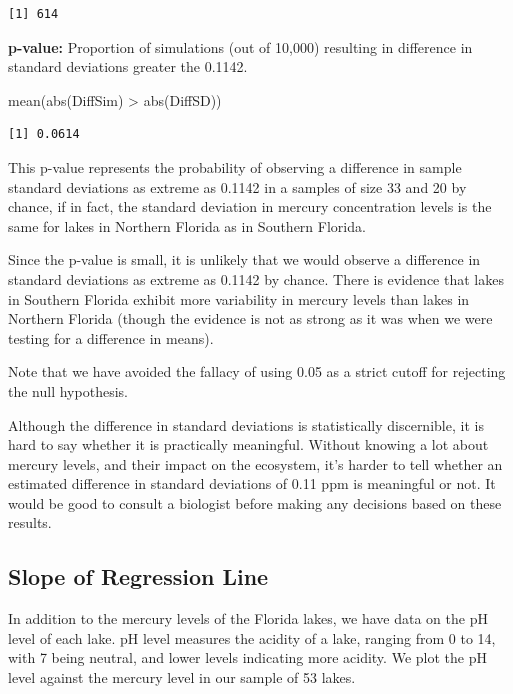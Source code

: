 \documentclass[
  letterpaper,
  DIV=11,
  numbers=noendperiod]{scrreprt}
\newenvironment{Shaded}{\begin{snugshade}}{\end{snugshade}}
\newcommand{\FunctionTok}[1]{\textcolor[rgb]{0.28,0.35,0.67}{#1}}
\newcommand{\NormalTok}[1]{\textcolor[rgb]{0.00,0.23,0.31}{#1}}
\newcommand{\SpecialCharTok}[1]{\textcolor[rgb]{0.37,0.37,0.37}{#1}}
\begin{document}
\begin{verbatim}
[1] 614
\end{verbatim}

\textbf{p-value:} Proportion of simulations (out of 10,000) resulting in
difference in standard deviations greater the 0.1142.

\begin{Shaded}
\begin{Highlighting}[]
\FunctionTok{mean}\NormalTok{(}\FunctionTok{abs}\NormalTok{(DiffSim) }\SpecialCharTok{\textgreater{}} \FunctionTok{abs}\NormalTok{(DiffSD))}
\end{Highlighting}
\end{Shaded}

\begin{verbatim}
[1] 0.0614
\end{verbatim}

This p-value represents the probability of observing a difference in
sample standard deviations as extreme as 0.1142 in a samples of size 33
and 20 by chance, if in fact, the standard deviation in mercury
concentration levels is the same for lakes in Northern Florida as in
Southern Florida.

Since the p-value is small, it is unlikely that we would observe a
difference in standard deviations as extreme as 0.1142 by chance. There
is evidence that lakes in Southern Florida exhibit more variability in
mercury levels than lakes in Northern Florida (though the evidence is
not as strong as it was when we were testing for a difference in means).

Note that we have avoided the fallacy of using 0.05 as a strict cutoff
for rejecting the null hypothesis.

Although the difference in standard deviations is statistically
discernible, it is hard to say whether it is practically meaningful.
Without knowing a lot about mercury levels, and their impact on the
ecosystem, it's harder to tell whether an estimated difference in
standard deviations of 0.11 ppm is meaningful or not. It would be good
to consult a biologist before making any decisions based on these
results.

\subsection{Slope of Regression Line}\label{slope-of-regression-line}

In addition to the mercury levels of the Florida lakes, we have data on
the pH level of each lake. pH level measures the acidity of a lake,
ranging from 0 to 14, with 7 being neutral, and lower levels indicating
more acidity. We plot the pH level against the mercury level in our
sample of 53 lakes.
\end{document}
